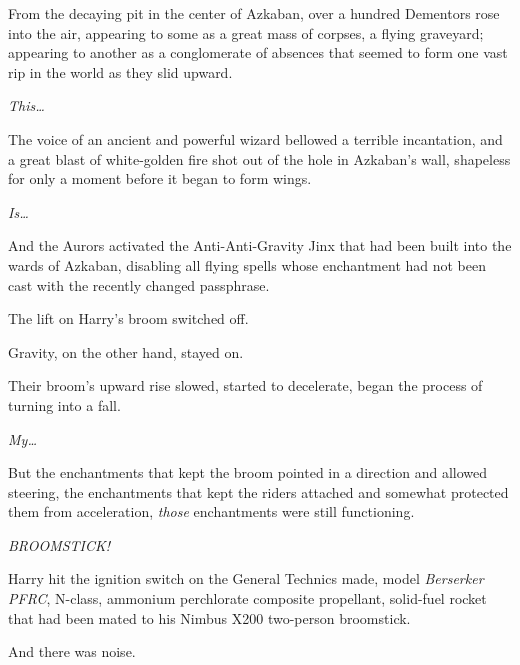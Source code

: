 From the decaying pit in the center of Azkaban, over a hundred Dementors rose 
into the air, appearing to some as a great mass of corpses, a flying graveyard; 
appearing to another as a conglomerate of absences that seemed to form one vast 
rip in the world as they slid upward.

\emph{This{\ldots}}

The voice of an ancient and powerful wizard bellowed a terrible incantation, 
and a great blast of white-golden fire shot out of the hole in Azkaban's wall, 
shapeless for only a moment before it began to form wings.

\emph{Is{\ldots}}

And the Aurors activated the Anti-Anti-Gravity Jinx that had been built into 
the wards of Azkaban, disabling all flying spells whose enchantment had not 
been cast with the recently changed passphrase.

The lift on Harry's broom switched off.

Gravity, on the other hand, stayed on.

Their broom's upward rise slowed, started to decelerate, began the process of 
turning into a fall.

\emph{My{\ldots}}

But the enchantments that kept the broom pointed in a direction and allowed 
steering, the enchantments that kept the riders attached and somewhat protected 
them from acceleration, \emph{those} enchantments were still functioning.

\emph{BROOMSTICK!}

Harry hit the ignition switch on the General Technics made, model 
\emph{Berserker PFRC}, N-class, ammonium perchlorate composite propellant, 
solid-fuel rocket that had been mated to his Nimbus X200 two-person broomstick.

And there was noise.
